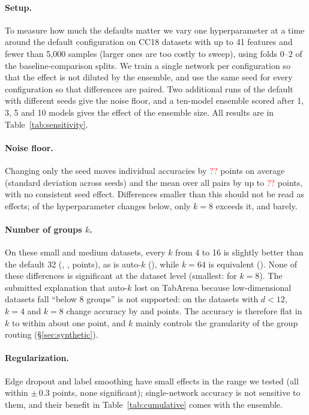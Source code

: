 \documentclass[anon,12pt]{clear2027} %
\providecommand{\SensSeedSd}{\textcolor{red}{??}}
\providecommand{\SensSeedMeanSpread}{\textcolor{red}{??}}
\begin{document}
\paragraph{Setup.}
To measure how much the defaults matter we vary one hyperparameter at a time around the default configuration on \SensTasks{} CC18 datasets with up to 41 features and fewer than 5,000 samples (larger ones are too costly to sweep), using folds 0--2 of the baseline-comparison splits. We train a single network per configuration so that the effect is not diluted by the ensemble, and use the same seed for every configuration so that differences are paired. Two additional runs of the default with different seeds give the noise floor, and a ten-model ensemble scored after 1, 3, 5 and 10 models gives the effect of the ensemble size. All results are in Table~\ref{tab:sensitivity}.

\paragraph{Noise floor.}
Changing only the seed moves individual accuracies by \SensSeedSd{} points on average (standard deviation across seeds) and the mean over all pairs by up to \SensSeedMeanSpread{} points, with no consistent seed effect. Differences smaller than this should not be read as effects; of the hyperparameter changes below, only $k=8$ exceeds it, and barely.

\paragraph{Number of groups $k$.}
On these small and medium datasets, every $k$ from 4 to 16 is slightly better than the default 32 (\SenskFourDelta{}, \SenskEightDelta{}, \SenskOneSixDelta{} points), as is auto-$k$ (\SenskautoDelta{}), while $k=64$ is equivalent (\SenskSixFourDelta{}). None of these differences is significant at the dataset level (smallest: \SenskEightPe{} for $k=8$). The submitted explanation that auto-$k$ lost on TabArena because low-dimensional datasets fall ``below 8 groups'' is not supported: on the \SensLowDN{} datasets with $d<12$, $k=4$ and $k=8$ change accuracy by \SensLowDkFourDelta{} and \SensLowDkEightDelta{} points. The accuracy is therefore flat in $k$ to within about one point, and $k$ mainly controls the granularity of the group routing (\S\ref{sec:synthetic}).

\paragraph{Regularization.}
Edge dropout and label smoothing have small effects in the range we tested (all within $\pm$\,0.3 points, none significant); single-network accuracy is not sensitive to them, and their benefit in Table~\ref{tab:cumulative} comes with the ensemble.
\end{document}
